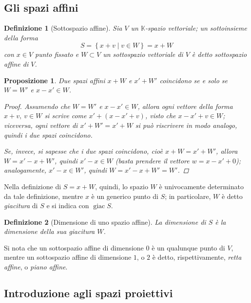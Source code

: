 \documentclass[11pt, a4paper]{scrartcl}
\theoremstyle{style1}
\newtheorem{prop}{Proposizione}[section]
\newtheorem{definizione}{Definizione}[section]
\numberwithin{equation}{subsection}
\begin{document}
\subsection{Gli spazi affini}
\begin{definizione}
	[Sottospazio affine]
	Sia $V$ un $\mathbb{K}$-spazio vettoriale; un sottoinsieme della forma
	\[
	S = \left\{ x+v  \mid v \in W \right\} = x + W
	\] 
	con $x\in V $ punto fissato e $W \subset V$ un sottospazio vettoriale di $V$ \`e detto \textit{sottospazio affine} di $V$.
\end{definizione}
\begin{prop}
	Due spazi affini $x + W$ e $x' + W'$ coincidono se e solo se $W = W'$ e $x-x'\in W$.
	\begin{proof}
		Assumendo che $W = W'$ e $x-x' \in W$, allora ogni vettore della forma $x + v, \ v \in W$ si scrive come $x' + (x-x' + v)$, visto che $x - x' + v \in W$; viceversa, ogni vettore di $x' + W' = x ' + W$ si pu\`o riscrivere in modo analogo, quindi i due spazi coincidono.

		Se, invece, si sapesse che i due spazi coincidono, cio\`e $x + W = x' +W'$, allora $W = x'-x + W'$, quindi $x' - x \in W$ (basta prendere il vettore $w = x - x' + 0$); analogamente, $x'-x \in W'$, quindi $W = x'-x + W' = W'$.
	\end{proof}
\end{prop}
\noindent Nella definizione di $S = x + W$, quindi, lo spazio $W$ \`e univocamente determinato da tale definizione, mentre $x $ \`e un generico punto di $S$; in particolare, $W$ \`e detto \textit{giacitura} di $S$ e si indica con $\operatorname{giac} S$.
\begin{definizione}
	[Dimensione di uno spazio affine]
	La dimensione di $S$ \`e la dimensione della sua giacitura $W$.
\end{definizione}
\noindent Si nota che un sottospazio affine di dimensione $0$ \`e un qualunque punto di $V$, mentre un sottospazio affine di dimensione $1$, o $2$ \`e detto, rispettivamente, \textit{retta affine}, o \textit{piano affine}.

\subsection{Introduzione agli spazi proiettivi}
\end{document}
